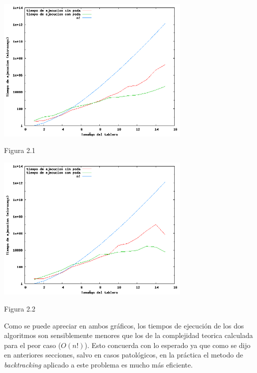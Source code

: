 \documentclass[a4paper,10pt] {article}
\begin{document}
\begin{center}
 \includegraphics[width=0.7\textwidth]{Plots/Ej2-Complejidad2.png}
\begin{center}
Figura 2.1
\end{center}
\end{center}

\begin{center}
 \includegraphics[width=0.7\textwidth]{Plots/Ej2-Complejidad1.png}
\begin{center}
Figura 2.2
\end{center}
\end{center}

Como se puede apreciar en ambos gr\'aficos, los tiempos de ejecuci\'on de los dos algoritmos son sensiblemente menores que los de la complejidad teorica calculada para el peor caso ($O(n!)$). Esto concuerda con lo esperado ya que como se dijo en anteriores secciones, salvo en casos patol\'ogicos, en la pr\'actica el metodo de \textit{backtracking} aplicado a este problema es mucho m\'as eficiente.
\end{document}
